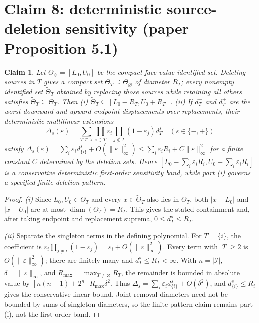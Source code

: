 \documentclass[11pt,a4paper]{article}
\theoremstyle{plain}
\newtheorem{claim}{Claim}
\theoremstyle{remark}
\begin{document}
\section{Claim 8: deterministic source-deletion sensitivity (paper Proposition 5.1)}

\begin{claim}
Let $\Theta_\varnothing=[L_0,U_0]$ be the compact face-value identified set. Deleting sources in $T$ gives a compact set $\Theta_T\supseteq\Theta_\varnothing$ of diameter $R_T$; every nonempty identified set $\widetilde\Theta_T$ obtained by replacing those sources while retaining all others satisfies $\widetilde\Theta_T\subseteq\Theta_T$. Then (i) $\widetilde\Theta_T\subseteq[L_0-R_T,U_0+R_T]$. (ii) If $d_T^-$ and $d_T^+$ are the worst downward and upward endpoint displacements over replacements, their deterministic multilinear extensions
\[
\Delta_s(\varepsilon)=\sum_{T\subseteq\mathcal I}
\prod_{i\in T}\varepsilon_i\prod_{j\notin T}(1-\varepsilon_j)d_T^s
\quad(s\in\{-,+\})
\]
satisfy $\Delta_s(\varepsilon)=\sum_i\varepsilon_i d_{\{i\}}^s+O(\|\varepsilon\|_\infty^2)\le\sum_i\varepsilon_iR_i+C\|\varepsilon\|_\infty^2$ for a finite constant $C$ determined by the deletion sets. Hence $[L_0-\sum_i\varepsilon_iR_i,U_0+\sum_i\varepsilon_iR_i]$ is a conservative deterministic first-order sensitivity band, while part (i) governs a specified finite deletion pattern.
\end{claim}

\begin{proof}
\emph{(i)} Since $L_0,U_0\in\Theta_T$ and every $x\in\widetilde\Theta_T$ also lies in $\Theta_T$, both $|x-L_0|$ and $|x-U_0|$ are at most $\operatorname{diam}(\Theta_T)=R_T$. This gives the stated containment and, after taking endpoint and replacement suprema, $0\le d_T^s\le R_T$.

\emph{(ii)} Separate the singleton terms in the defining polynomial. For $T=\{i\}$, the coefficient is $\varepsilon_i\prod_{j\ne i}(1-\varepsilon_j)=\varepsilon_i+O(\|\varepsilon\|_\infty^2)$. Every term with $|T|\ge2$ is $O(\|\varepsilon\|_\infty^2)$; there are finitely many and $d_T^s\le R_T<\infty$. With $n=|\mathcal I|$, $\delta=\|\varepsilon\|_\infty$, and $R_{\max}=\max_{T\ne\varnothing}R_T$, the remainder is bounded in absolute value by $[n(n-1)+2^n]R_{\max}\delta^2$. Thus $\Delta_s=\sum_i\varepsilon_i d_{\{i\}}^s+O(\delta^2)$, and $d_{\{i\}}^s\le R_i$ gives the conservative linear bound. Joint-removal diameters need not be bounded by sums of singleton diameters, so the finite-pattern claim remains part (i), not the first-order band.
\end{proof}
\end{document}
